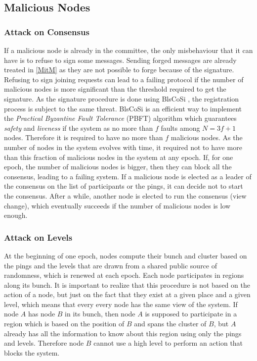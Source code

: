 \documentclass[a4paper,11pt,twoside,openright]{report}
\begin{document}
\subsection{Malicious Nodes}
\subsubsection{Attack on Consensus} If a malicious
node is already in the committee, the only misbehaviour that it
can have is to refuse to sign some messages. Sending forged messages
are already treated in \autoref{MitM} as they are not possible to forge because
of the signature. Refusing to sign joining requests can lead to a failing protocol
if the number of malicious nodes is more significant than the threshold required to get
the signature. As the signature procedure is done using BlsCoSi \cite{Boneh2018},
the registration process is subject to the same threat. BlsCoSi
\cite{Boneh2018} is an efficient way to implement the \textit{Practical
Byzantine Fault Tolerance} (PBFT) \cite{Castro1999} algorithm which guarantees
\textit{safety} and \textit{liveness} if the system as no more than $f$ faults
among $N = 3f+1$ nodes. Therefore it is required to have no more than $f$
malicious nodes. As the number of nodes in the system evolves
with time, it required not to have more than this fraction of malicious nodes
in the system at any epoch. If, for one epoch, the number of malicious nodes is
bigger, then they can block all the consensus, leading to a failing system. 
If a malicious node is elected as a leader of the consensus on the list of
participants or the pings, it can decide not to start the consensus. After a
while, another node is elected to run the consensus (view change), which eventually
succeeds if the number of malicious nodes is low enough.

\subsubsection{Attack on Levels} \label{sec:ControlePlane-Threat-Model}
At the beginning of one epoch, nodes compute their bunch and cluster based on
the pings and the levels that are drawn from a shared public source of
randomness, which is renewed at each epoch. Each node participates in regions along its bunch. It is important
to realize that this procedure is not based on the action of a node, but just
on the fact that they exist at a given place and a given level, which means that every every node has the same view of the system. If node $A$
has node $B$ in its bunch, then node $A$ is supposed to participate in a
region which is based on the position of $B$ and spans the cluster of $B$, but
$A$ already has all the information to know about this region using only the
pings and levels. Therefore node $B$ cannot use a high level to perform an
action that blocks the system. 
\end{document}
